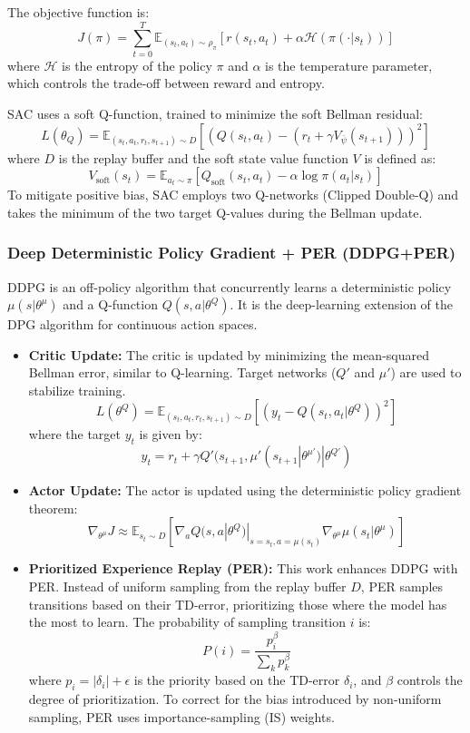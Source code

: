 The objective function is:
\[
J(\pi) = \sum_{t=0}^{T} \mathbb{E}_{(s_t, a_t) \sim \rho_\pi} \left[ r(s_t, a_t) + \alpha \mathcal{H}(\pi(\cdot|s_t)) \right]
\]
where $\mathcal{H}$ is the entropy of the policy $\pi$ and $\alpha$ is the temperature parameter, which controls the trade-off between reward and entropy.

SAC uses a soft Q-function, trained to minimize the soft Bellman residual:
\[
L(\theta_Q) = \mathbb{E}_{(s_t, a_t, r_t, s_{t+1}) \sim D} \left[ \left( Q(s_t, a_t) - \left(r_t + \gamma V_{\bar{\psi}}(s_{t+1})\right) \right)^2 \right]
\]
where $D$ is the replay buffer and the soft state value function $V$ is defined as:
\[
V_{\text{soft}}(s_t) = \mathbb{E}_{a_t \sim \pi} [Q_{\text{soft}}(s_t, a_t) - \alpha \log \pi(a_t|s_t)]
\]
To mitigate positive bias, SAC employs two Q-networks (Clipped Double-Q) and takes the minimum of the two target Q-values during the Bellman update.

\subsubsection{Deep Deterministic Policy Gradient + PER (DDPG+PER)}
DDPG is an off-policy algorithm that concurrently learns a deterministic policy $\mu(s | \theta^\mu)$ and a Q-function $Q(s, a | \theta^Q)$. It is the deep-learning extension of the DPG algorithm for continuous action spaces.

\begin{itemize}
    \item \textbf{Critic Update:} The critic is updated by minimizing the mean-squared Bellman error, similar to Q-learning. Target networks ($Q'$ and $\mu'$) are used to stabilize training.
    \[
    L(\theta^Q) = \mathbb{E}_{(s_t, a_t, r_t, s_{t+1}) \sim D} \left[ (y_t - Q(s_t, a_t | \theta^Q))^2 \right]
    \]
    where the target $y_t$ is given by:
    \[
    y_t = r_t + \gamma Q'(s_{t+1}, \mu'(s_{t+1}|
    \theta^{\mu'})|
    \theta^{Q'})
    \]
    \item \textbf{Actor Update:} The actor is updated using the deterministic policy gradient theorem:
    \[
    \nabla_{\theta^\mu} J \approx \mathbb{E}_{s_t \sim D} [\nabla_a Q(s, a | \theta^Q)|_{s=s_t, a=\mu(s_t)} \nabla_{\theta^\mu} \mu(s_t | \theta^\mu)]
    \]
    \item \textbf{Prioritized Experience Replay (PER):} This work enhances DDPG with PER. Instead of uniform sampling from the replay buffer $D$, PER samples transitions based on their TD-error, prioritizing those where the model has the most to learn. The probability of sampling transition $i$ is:
    \[
    P(i) = \frac{p_i^\beta}{\sum_k p_k^\beta}
    \]
    where $p_i = |\delta_i| + \epsilon$ is the priority based on the TD-error $\delta_i$, and $\beta$ controls the degree of prioritization. To correct for the bias introduced by non-uniform sampling, PER uses importance-sampling (IS) weights.
\end{itemize}


